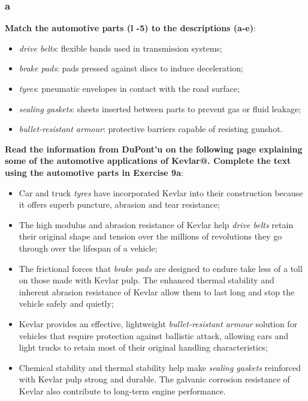 \subsubsection{a}

\textbf{Match the automotive parts (l -5) to the descriptions (a-e)}:

\begin{itemize}

\item \textit{drive belts}: flexible bands used in transmission systems;
\item \textit{brake pads}: pads pressed against discs to induce deceleration;
\item \textit{tyres}: pneumatic envelopes in contact with the road surface;
\item \textit{sealing gaskets}: sheets inserted between parts to prevent gas or fluid leakage;
\item \textit{bullet-resistant armour}: protective barriers capable of resisting gunshot.

\end{itemize}

\textbf{Read the information from DuPont'u on the following page explaining some of the automotive applications of Kevlar@. Complete the text using the automotive parts in Exercise 9a}:

\begin{itemize}

\item Car and truck \textit{tyres} have incorporated Kevlar into their construction because it offers superb puncture, abrasion and tear resistance;

\item The high modulus and abrasion resistance of Kevlar help \textit{drive belts} retain their original shape and tension over the millions of revolutions they go through over the lifespan of a vehicle;

\item The frictional forces that \textit{brake pads} are designed to endure take less of a toll on those made with Kevlar pulp. The enhanced thermal stability and inherent abrasion resistance of Kevlar allow them to last long and stop the vehicle safely and quietly;

\item Kevlar provides an effective, lightweight \textit{bullet-resistant armour} solution for vehicles that require protection against ballistic attack, allowing cars and light trucks to retain most of their original handling characteristics;

\item Chemical stability and thermal stability help make \textit{sealing gaskets} reinforced with Kevlar pulp strong and durable. The galvanic corrosion resistance of Kevlar also contribute to long-term engine performance.

\end{itemize}

